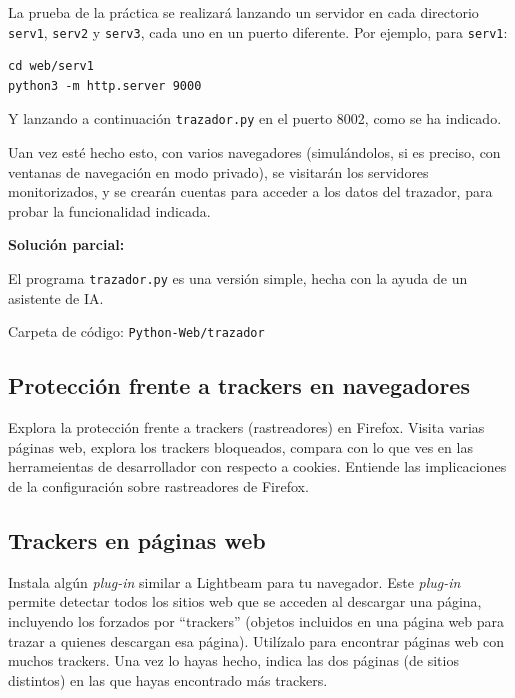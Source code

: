 La prueba de la práctica se realizará lanzando un servidor en cada directorio \texttt{serv1}, \texttt{serv2} y \texttt{serv3}, cada uno en un puerto diferente. Por ejemplo, para \texttt{serv1}:

\begin{verbatim}
cd web/serv1
python3 -m http.server 9000
\end{verbatim}

Y lanzando a continuación \texttt{trazador.py} en el puerto 8002, como se ha indicado.

Uan vez esté hecho esto, con varios navegadores (simulándolos, si es preciso, con ventanas de navegación en modo privado), se visitarán los servidores monitorizados, y se crearán cuentas para acceder a los datos del trazador, para probar la funcionalidad indicada.

\textbf{Solución parcial:}

El programa \texttt{trazador.py} es una versión simple, hecha con la ayuda de un asistente de IA.

Carpeta de código: \texttt{Python-Web/trazador}


\subsection{Protección frente a trackers en navegadores}
\label{subsec:trackers-navegadores}

Explora la protección frente a trackers (rastreadores) en Firefox. Visita varias páginas web, explora los trackers bloqueados, compara con lo que ves en las herrameientas de desarrollador con respecto a cookies. Entiende las implicaciones de la configuración sobre rastreadores de Firefox.

\subsection{Trackers en páginas web}
\label{subsec:trackers-paginas-web}

Instala algún \emph{plug-in} similar a Lightbeam para tu navegador. Este \emph{plug-in} permite detectar todos los sitios web que se acceden al descargar una página, incluyendo los forzados por ``trackers'' (objetos incluidos en una página web para trazar a quienes descargan esa página). Utilízalo para encontrar páginas web con muchos trackers. Una vez lo hayas hecho, indica las dos páginas (de sitios distintos) en las que hayas encontrado más trackers.

